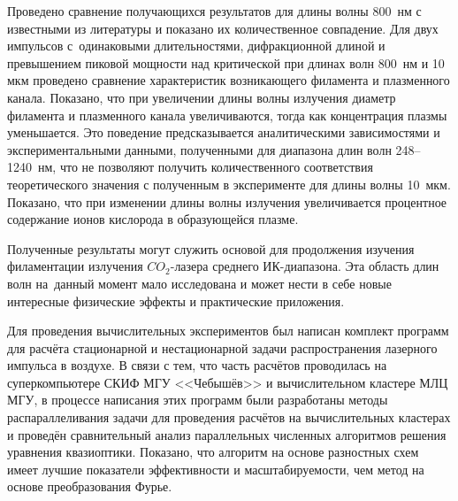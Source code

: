 Проведено сравнение получающихся результатов для длины волны 800~нм с известными из литературы и показано их количественное совпадение.
Для двух импульсов с~одинаковыми длительностями, дифракционной длиной и превышением пиковой мощности над критической
при длинах волн 800~нм и 10 мкм проведено сравнение характеристик возникающего филамента и плазменного канала.
Показано, что при увеличении длины волны излучения диаметр филамента и плазменного канала увеличиваются,
тогда как концентрация плазмы уменьшается.
Это поведение предсказывается аналитическими зависимостями и экспериментальными данными,
полученными для диапазона длин волн 248--1240~нм,
что не позволяют получить количественного соответствия теоретического значения
с полученным в эксперименте для длины волны 10~мкм.
Показано, что при изменении длины волны излучения увеличивается процентное содержание ионов кислорода в образующейся плазме.


Полученные результаты могут служить основой для продолжения изучения филаментации излучения $CO_2$-лазера среднего ИК-диапазона.
Эта область длин волн на~данный момент мало исследована и может нести в себе новые интересные физические эффекты и практические приложения.


Для проведения вычислительных экспериментов был написан комплект программ
для расчёта стационарной и нестационарной задачи распространения лазерного импульса в воздухе.
В связи с тем, что часть расчётов проводилась на суперкомпьютере СКИФ МГУ <<Чебышёв>> и вычислительном кластере МЛЦ МГУ,
в процессе написания этих программ были разработаны методы распараллеливания задачи
для проведения расчётов на вычислительных кластерах и проведён сравнительный анализ параллельных численных алгоритмов решения уравнения
квазиоптики. Показано, что алгоритм на основе разностных схем имеет лучшие показатели эффективности
и масштабируемости, чем метод на основе преобразования Фурье.


